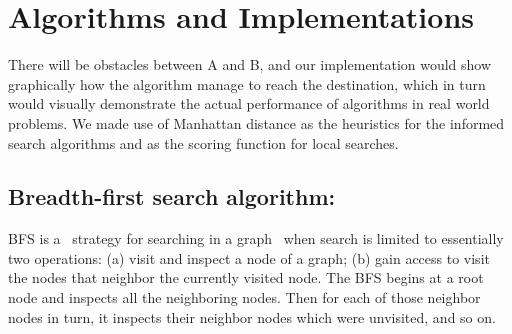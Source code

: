 \documentclass[a4paper]{article}
\begin{document}
 

\section{Algorithms and Implementations}

There will be obstacles between A and B, and our implementation would show graphically how the algorithm manage to reach the destination, which in turn would visually demonstrate the actual performance of algorithms in real world problems. We made use of Manhattan distance as the heuristics for the informed search algorithms and as the scoring function for local searches.


\subsection{Breadth-first search algorithm:}

BFS is a  strategy for searching in a graph  when search is limited to essentially two operations: (a) visit and inspect a node of a graph; (b) gain access to visit the nodes that neighbor the currently visited node. The BFS begins at a root node and inspects all the neighboring nodes. Then for each of those neighbor nodes in turn, it inspects their neighbor nodes which were unvisited, and so on.
\end{document}
